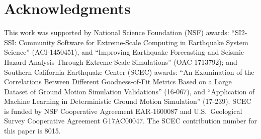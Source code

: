 
\section{Acknowledgments}
\small

This work was supported by National Science Foundation (NSF) awards: ``SI2-SSI: Community Software for Extreme-Scale Computing in Earthquake System Science'' (ACI-1450451), and ``Improving Earthquake Forecasting and Seismic Hazard Analysis Through Extreme-Scale Simulations'' (OAC-1713792); and Southern California Earthquake Center (SCEC) awards: ``An Examination of the Correlations Between Different Goodness-of-Fit Metrics Based on a Large Dataset of Ground Motion Simulation Validations'' (16-067), and ``Application of Machine Learning in Deterministic Ground Motion Simulation'' (17-239). SCEC is funded by NSF Cooperative Agreement EAR-1600087 and U.S.~Geological Survey Cooperative Agreement G17AC00047. The SCEC contribution number for this paper is 8015.


